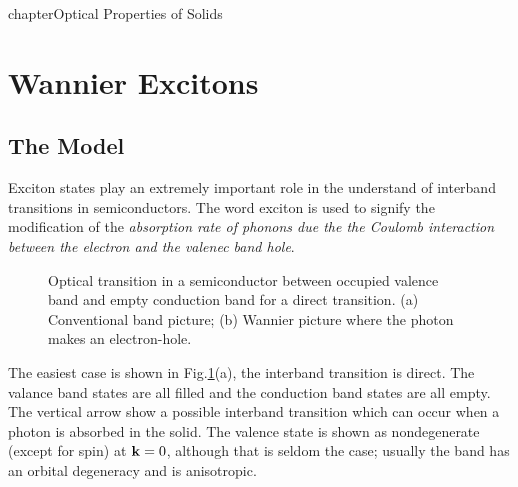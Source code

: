 chapter{Optical Properties of Solids}

\section{Wannier Excitons}\label{s9.2}
%
\subsection{The Model}
Exciton states play an extremely important role in the understand of interband transitions in semiconductors.
The word exciton is used to signify the modification of the \textit{absorption rate of phonons due the the Coulomb interaction between the electron and the valenec band hole}.

\begin{figure}[ht]
    \centering
    \caption{Optical transition in a semiconductor between occupied valence band and empty conduction band for a direct transition. (a) Conventional band picture; (b) Wannier picture where the photon makes an electron-hole.}%
    \label{fig:9.6}
\end{figure}
%
The easiest case is shown in Fig.\ref{fig:9.6}(a), the interband transition is direct.
The valance band states are all filled and the conduction band states are all empty.
The vertical arrow show a possible interband transition which can occur when a photon is absorbed in the solid.
The valence state is shown as nondegenerate (except for spin) at $\mathbf{k}=0$, although that is seldom the case; usually the band has an orbital degeneracy and is anisotropic.

